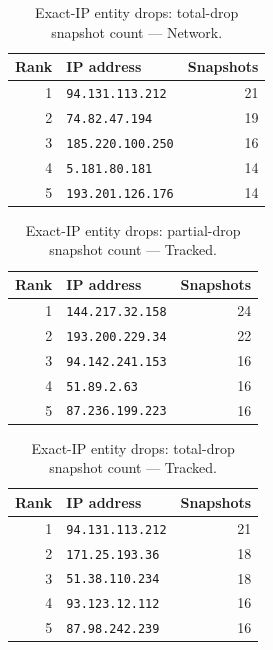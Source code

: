 \documentclass[conference]{IEEEtran}
\begin{document}
\begin{table}[H]
\caption{Exact-IP entity drops: total-drop snapshot count --- Network.}
\begin{center}\small
\begin{tabular}{|r|l|r|}
\hline
\textbf{Rank} & \textbf{IP address} & \textbf{Snapshots} \\ \hline
1 & \texttt{94.131.113.212} & 21 \\ \hline
2 & \texttt{74.82.47.194} & 19 \\ \hline
3 & \texttt{185.220.100.250} & 16 \\ \hline
4 & \texttt{5.181.80.181} & 14 \\ \hline
5 & \texttt{193.201.126.176} & 14 \\ \hline
\end{tabular}
\label{tab:ipdrop_total_network}
\end{center}\end{table}
 
\begin{table}[H]
\caption{Exact-IP entity drops: partial-drop snapshot count --- Tracked.}
\begin{center}\small
\begin{tabular}{|r|l|r|}
\hline
\textbf{Rank} & \textbf{IP address} & \textbf{Snapshots} \\ \hline
1 & \texttt{144.217.32.158} & 24 \\ \hline
2 & \texttt{193.200.229.34} & 22 \\ \hline
3 & \texttt{94.142.241.153} & 16 \\ \hline
4 & \texttt{51.89.2.63} & 16 \\ \hline
5 & \texttt{87.236.199.223} & 16 \\ \hline
\end{tabular}
\label{tab:ipdrop_partial_tracked}
\end{center}\end{table}
 
\begin{table}[H]
\caption{Exact-IP entity drops: total-drop snapshot count --- Tracked.}
\begin{center}\small
\begin{tabular}{|r|l|r|}
\hline
\textbf{Rank} & \textbf{IP address} & \textbf{Snapshots} \\ \hline
1 & \texttt{94.131.113.212} & 21 \\ \hline
2 & \texttt{171.25.193.36} & 18 \\ \hline
3 & \texttt{51.38.110.234} & 18 \\ \hline
4 & \texttt{93.123.12.112} & 16 \\ \hline
5 & \texttt{87.98.242.239} & 16 \\ \hline
\end{tabular}
\label{tab:ipdrop_total_tracked}
\end{center}\end{table}
 
\end{document}
